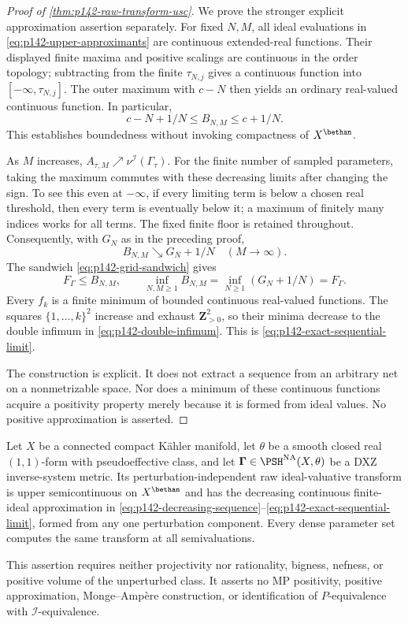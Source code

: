\begin{proof}[Proof of \cref{thm:p142-raw-transform-usc}]
We prove the stronger explicit approximation assertion separately.
For fixed $N,M$, all ideal evaluations in
\eqref{eq:p142-upper-approximants} are continuous extended-real
functions. Their displayed finite maxima and positive scalings are
continuous in the order topology; subtracting from the finite
$\tau_{N,j}$ gives a continuous function into $[-\infty,\tau_{N,j}]$.
The outer maximum with $c-N$ then yields an ordinary real-valued
continuous function. In particular,
\[
        c-N+1/N\leq B_{N,M}\leq c+1/N.
\]
This establishes boundedness without invoking compactness of $X^{\bethan}$.

As $M$ increases, $A_{\tau,M}\nearrow\nu^{\mathcal I}(\Gamma_\tau)$.
For the finite number of sampled parameters, taking the maximum commutes
with these decreasing limits after changing the sign. To see this even
at $-\infty$, if every limiting term is below a chosen real threshold,
then every term is eventually below it; a maximum of finitely many
indices works for all terms. The fixed finite floor is retained throughout.
Consequently, with $G_N$ as in the preceding proof,
\[
           B_{N,M}\searrow G_N+1/N\quad(M\to\infty).
\]
The sandwich \eqref{eq:p142-grid-sandwich} gives
\[
 F_\Gamma\leq B_{N,M},\qquad
 \inf_{N,M\geq1}B_{N,M}
      =\inf_{N\geq1}(G_N+1/N)=F_\Gamma.
 \tag{71.33j}
 \label{eq:p142-double-infimum}
\]
Every $f_k$ is a finite minimum of bounded continuous real-valued
functions. The squares $\{1,\ldots,k\}^2$ increase and exhaust
$\mathbf Z_{>0}^2$, so their minima decrease to the double infimum
in \eqref{eq:p142-double-infimum}. This is
\eqref{eq:p142-exact-sequential-limit}.

The construction is explicit. It does not extract a sequence from an
arbitrary net on a nonmetrizable space. Nor does a minimum of these
continuous functions acquire a positivity property merely because it
is formed from ideal values. No positive approximation is asserted.
\end{proof}

\begin{corollary}\label{cor:p142-pseudoeffective-raw-usc}
Let $X$ be a connected compact K\"ahler manifold, let $\theta$ be a
smooth closed real $(1,1)$-form with pseudoeffective class, and let
$\boldsymbol\Gamma\in\PSH^{\mathrm{NA}}(X,\theta)$ be a DXZ
inverse-system metric. Its perturbation-independent raw ideal-valuative
transform is upper semicontinuous on $X^{\bethan}$ and has the decreasing
continuous finite-ideal approximation in
\eqref{eq:p142-decreasing-sequence}--\eqref{eq:p142-exact-sequential-limit},
formed from any one perturbation component. Every dense parameter set
computes the same transform at all semivaluations.

This assertion requires neither projectivity nor rationality, bigness,
nefness, or positive volume of the unperturbed class. It asserts no MP
positivity, positive approximation, Monge--Amp\`ere construction, or
identification of $P$-equivalence with $\mathcal I$-equivalence.
\end{corollary}

